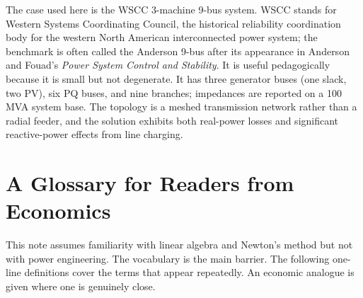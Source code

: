 \documentclass[11pt]{article}
\begin{document}
The case used here is the WSCC 3-machine 9-bus system. WSCC stands for
Western Systems Coordinating Council, the historical reliability
coordination body for the western North American interconnected power
system; the benchmark is often called the Anderson 9-bus after its
appearance in Anderson and Fouad's \emph{Power System Control and
Stability}. It is useful pedagogically because it is small but not
degenerate. It has three generator buses (one slack, two PV), six PQ
buses, and nine branches; impedances are reported on a 100 MVA system
base. The topology is a meshed transmission network rather than a radial
feeder, and the solution exhibits both real-power losses and significant
reactive-power effects from line charging.

\section{A Glossary for Readers from Economics}\label{sec:glossary}

This note assumes familiarity with linear algebra and Newton's method but
not with power engineering. The vocabulary is the main barrier. The
following one-line definitions cover the terms that appear repeatedly. An
economic analogue is given where one is genuinely close.
\end{document}
